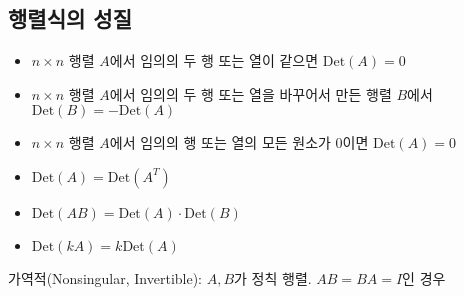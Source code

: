 \subsection{행렬식의 성질}
\begin{itemize}
    \item $n \times n$ 행렬 $A$에서 임의의 두 행 또는 열이 같으면 $\mathrm{Det}(A) = 0$
    \item $n \times n$ 행렬 $A$에서 임의의 두 행 또는 열을 바꾸어서 만든 행렬 $B$에서 $\mathrm{Det}(B) = -\mathrm{Det}(A)$
    \item $n \times n$ 행렬 $A$에서 임의의 행 또는 열의 모든 원소가 $0$이면 $\mathrm{Det}(A) = 0$
    \item $\mathrm{Det}(A) = \mathrm{Det}(A^T)$
    \item $\mathrm{Det}(AB) = \mathrm{Det}(A) \cdot \mathrm{Det}(B)$
    \item $\mathrm{Det}(kA) = k\mathrm{Det}(A)$
\end{itemize}$$$$
가역적(Nonsingular, Invertible): $A, B$가 정칙 행렬. $AB=BA=I$인 경우
